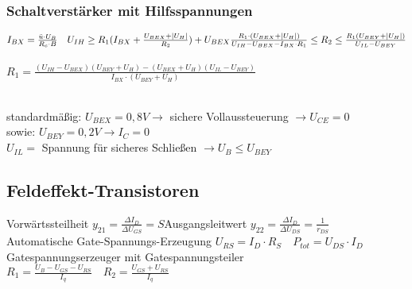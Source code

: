     \subsubsection{Schaltverstärker mit Hilfsspannungen}
    \label{Schaltverstaerker-Hilfsspannungen}
        \begin{minipage}{0.7\columnwidth}
            \large
            $I_{BX}=\frac{\ddot{u}\cdot U_B}{R_c\cdot B}\quad U_{IH}\geq R_1(I_{BX}+\frac{U_{BEX}+|U_H|}{R_2})+U_{BEX}\\\\
            \frac{R_1\cdot (U_{BEX}+|U_H|)}{U_{IH}-U_{BEX}-I_{BX}\cdot R_1}\leq R_2\leq\frac{R_1(U_{BEY}+|U_H|)}{U_{IL}-U_{BEY}}$\\\\
            $R_1=\frac{(U_{IH}-U_{BEX})(U_{BEY}+U_H)-(U_{BEX}+U_H)(U_{IL}-U_{BEY})}{I_{BX}\cdot (U_{BEY}+U_H)}$\\\\
            \normalsize
        \end{minipage}
        \begin{minipage}{0.3\columnwidth}
        \end{minipage}
        standardmäßig: $U_{BEX}=0,8V\rightarrow$ sichere Vollaussteuerung $\rightarrow U_{CE}=0$\\
        sowie: $U_{BEY}=0,2V\rightarrow I_C=0$\\
        $U_{IL}=$ Spannung für sicheres Schließen $\rightarrow U_B\leq U_{BEY}$
\subsection{Feldeffekt-Transistoren}
    Vorwärtssteilheit $y_{21}=\frac{\Delta I_D}{\Delta U_{GS}}=S$\quad Ausgangsleitwert $y_{22}=\frac{\Delta I_D}{\Delta U_{DS}}=\frac{1}{r_{DS}}$\\
    Automatische Gate-Spannungs-Erzeugung $U_{RS}=I_D\cdot R_S\quad P_{tot}=U_{DS}\cdot I_D$\\
    Gatespannungserzeuger mit Gatespannungsteiler $R_1=\frac{U_B-U_{GS}-U_{RS}}{I_q}\quad R_2=\frac{U_{GS}+U_{RS}}{I_q}$
